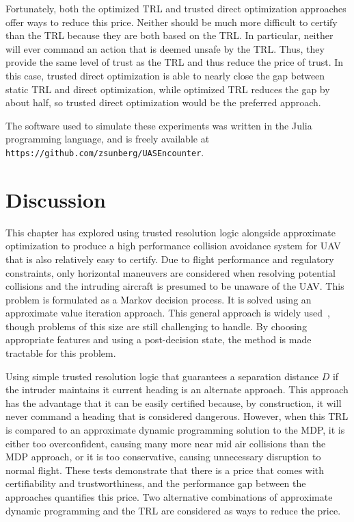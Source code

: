 Fortunately, both the optimized TRL and trusted direct optimization approaches offer ways to reduce this price.
Neither should be much more difficult to certify than the TRL because they are both based on the TRL.
In particular, neither will ever command an action that is deemed unsafe by the TRL. 
Thus, they provide the same level of trust as the TRL and thus reduce the price of trust.
In this case, trusted direct optimization is able to nearly close the gap between static TRL and direct optimization, while optimized TRL reduces the gap by about half, so trusted direct optimization would be the preferred approach.

The software used to simulate these experiments was written in the Julia programming language, and is freely available at \texttt{\small{https://github.com/zsunberg/UASEncounter}}.

\section{Discussion}

This chapter has explored using trusted resolution logic alongside approximate optimization to produce a high performance collision avoidance system for UAV that is also relatively easy to certify.
Due to flight performance and regulatory constraints, only horizontal maneuvers are considered when resolving potential collisions and the intruding aircraft is presumed to be unaware of the UAV.
This problem is formulated as a Markov decision process.
It is solved using an approximate value iteration approach.
This general approach is widely used~\cite{kochenderfer2015decision}, though problems of this size are still challenging to handle.
By choosing appropriate features and using a post-decision state, the method is made tractable for this problem.

Using simple trusted resolution logic that guarantees a separation distance $D$ if the intruder maintains it current heading is an alternate approach.
This approach has the advantage that it can be easily certified because, by construction, it will never command a heading that is considered dangerous.
However, when this TRL is compared to an approximate dynamic programming solution to the MDP, it is either too overconfident, causing many more near mid air collisions than the MDP approach, or it is too conservative, causing unnecessary disruption to normal flight.
These tests demonstrate that there is a price that comes with certifiability and trustworthiness, and the performance gap between the approaches quantifies this price. Two alternative combinations of approximate dynamic programming and the TRL are considered as ways to reduce the price.

